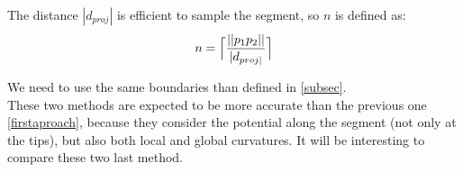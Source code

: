 \documentclass[11pt,a4paper]{article}
\begin{document}
The distance $|d_{proj}|$ is efficient to sample the segment, so $n$ is defined as:
\begin{equation}
n = \Bigl\lceil\frac{||p_1p_2||}{|d_{proj|}}\Bigr\rceil
\end{equation}

We need to use the same boundaries than defined in \ref{subsec}.\\




These two methods are expected to be more accurate than the previous one \ref{firstaproach}, because they consider the potential along the segment (not only at the tips), but also both local and global curvatures.
It will be interesting to compare these two last method.




	
\end{document}
